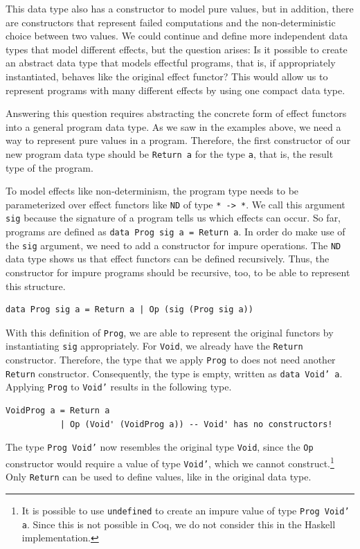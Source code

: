 \documentclass[a4paper, 11pt, fleqn, twoside]{scrreprt}
\newcommand{\hinl}[1]{\texttt{#1}}
\newcommand{\cinl}[1]{\texttt{#1}}
\begin{document}
This data type also has a constructor to model pure values, but in addition, there are constructors that represent failed computations and the non-deterministic choice between two values.
We could continue and define more independent data types that model different effects, but the question arises: Is it possible to create an abstract data type that models effectful programs, that is, if appropriately instantiated, behaves like the original effect functor?
This would allow us to represent programs with many different effects by using one compact data type.

Answering this question requires abstracting the concrete form of effect functors into a general program data type.
As we saw in the examples above, we need a way to represent pure values in a program.
Therefore, the first constructor of our new program data type should be \hinl{Return a} for the type \hinl{a}, that is, the result type of the program.

To model effects like non-determinism, the program type needs to be parameterized over effect functors like \hinl{ND} of type \hinl{* -> *}.
We call this argument \hinl{sig} because the signature of a program tells us which effects can occur.
So far, programs are defined as \hinl{data Prog sig a = Return a}.
In order do make use of the \hinl{sig} argument, we need to add a constructor for impure operations.
The \hinl{ND} data type shows us that effect functors can be defined recursively.
Thus, the constructor for impure programs should be recursive, too, to be able to represent this structure.

\begin{verbatim}
data Prog sig a = Return a | Op (sig (Prog sig a))
\end{verbatim}

With this definition of \hinl{Prog}, we are able to represent the original functors by instantiating \hinl{sig} appropriately.
For \hinl{Void}, we already have the \hinl{Return} constructor.
Therefore, the type that we apply \hinl{Prog} to does not need another \hinl{Return} constructor.
Consequently, the type is empty, written as \hinl{data Void' a}.
Applying \cinl{Prog} to \cinl{Void'} results in the following type.

\begin{verbatim}
VoidProg a = Return a
           | Op (Void' (VoidProg a)) -- Void' has no constructors!
\end{verbatim}

The type \hinl{Prog Void'} now resembles the original type \hinl{Void}, since the \hinl{Op} constructor would require a value of type \hinl{Void'}, which we cannot construct.\footnote{It is possible to use \texttt{undefined} to create an impure value of type \texttt{Prog Void' a}.
Since this is not possible in Coq, we do not consider this in the Haskell implementation.}
Only \hinl{Return} can be used to define values, like in the  original data type.
\end{document}

